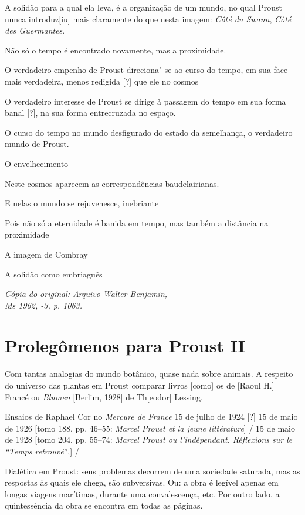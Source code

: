 A solidão para a qual ela leva, é a organização de um mundo, no qual
Proust nunca introduz{[}iu{]} mais claramente do que nesta imagem:
\emph{Côté du Swann}, \emph{Côté des Guermantes}.

Não só o tempo é encontrado novamente, mas a proximidade.

O verdadeiro empenho de Proust direciona"-se ao curso do tempo, em sua
face mais verdadeira, menos redigida {[}?{]} que ele no cosmos

O verdadeiro interesse de Proust se dirige à passagem do tempo em sua
forma banal {[}?{]}, na sua forma entrecruzada no espaço.

O curso do tempo no mundo desfigurado do estado da semelhança, o
verdadeiro mundo de Proust.

O envelhecimento

Neste cosmos aparecem as correspondências baudelairianas.

E nelas o mundo se rejuvenesce, inebriante

Pois não só a eternidade é banida em tempo, mas também a distância na
proximidade

A imagem de Combray

A solidão como embriaguês


\begin{flushright}
\emph{\footnotesize{Cópia do original: Arquivo Walter Benjamin,\\ Ms 1962, -3, p. 1063.}}
\end{flushright}

\section{Prolegômenos para Proust II}

Com tantas analogias do mundo botânico, quase nada sobre animais. A
respeito do universo das plantas em Proust comparar livros {[}como{]} os
de {[}Raoul H.{]} Francé ou \emph{Blumen} {[}Berlim, 1928{]} de Th{[}eodor{]} Lessing.

Ensaios de Raphael Cor no \emph{Mercure de France} 15 de julho de 1924
{[}?{]} 15 de maio de 1926 {[}tomo 188, pp. 46--55: \emph{Marcel Proust et
la jeune littérature}{]} / 15 de maio de 1928 {[}tomo 204, pp. 55--74:
\emph{Marcel Proust ou l'indépendant. Réflexions sur le ``Temps
retrouvé}'',{]} /

Dialética em Proust: seus problemas decorrem de uma sociedade saturada,
mas as respostas às quais ele chega, são subversivas. Ou: a obra é
legível apenas em longas viagens marítimas, durante uma convalescença,
etc. Por outro lado, a quintessência da obra se encontra em todas as
páginas.

